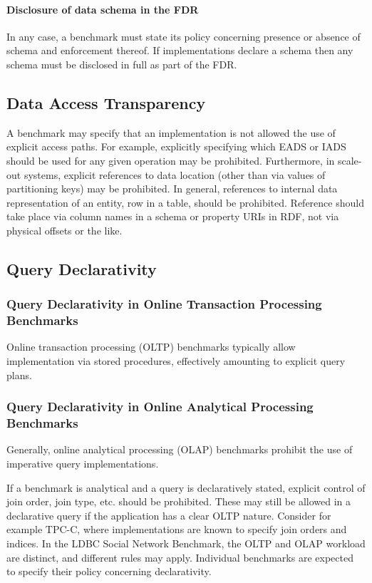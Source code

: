 \paragraph{Disclosure of data schema in the FDR}
In any case, a benchmark must state its policy concerning presence or absence of schema and enforcement thereof. If implementations declare a schema then any schema must be disclosed in full as part of the FDR.

\subsection{Data Access Transparency}

A benchmark may specify that an implementation is not allowed the use of explicit access paths. For example, explicitly specifying which EADS or IADS should be used for any given operation may be prohibited. Furthermore, in scale-out systems, explicit references to data location (other than via values of partitioning keys) may be prohibited. In general, references to internal data representation of an entity, \eg row in a table, should be prohibited. Reference should take place via column names in a schema or property URIs in RDF, not via physical offsets or the like.

\subsection{Query Declarativity}
\label{sec:query-declarativity}


\subsubsection{Query Declarativity in Online Transaction Processing Benchmarks}
Online transaction processing (OLTP) benchmarks typically allow implementation via stored procedures, effectively amounting to explicit query plans. 

\subsubsection{Query Declarativity in Online Analytical Processing Benchmarks}
Generally, online analytical processing (OLAP) benchmarks prohibit the use of imperative query implementations. 

If a benchmark is analytical and a query is declaratively stated, explicit control of join order, join type, etc. should be prohibited. These may still be allowed in a declarative query if the application has a clear OLTP nature. Consider for example TPC-C, where implementations are known to specify join orders and indices.
In the LDBC Social Network Benchmark, the OLTP and OLAP workload are distinct, and different rules may apply.
Individual benchmarks are expected to specify their policy concerning declarativity.

